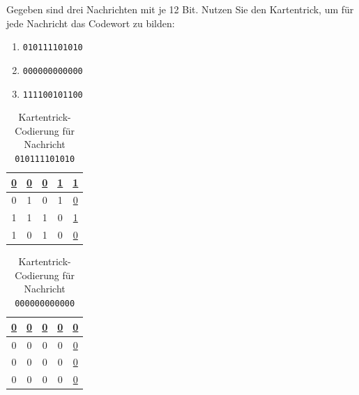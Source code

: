\begin{myexercise}
    Gegeben sind drei Nachrichten mit je 12 Bit. Nutzen Sie den Kartentrick, um für jede Nachricht das Codewort zu bilden:

    \begin{enumerate}
        \item \texttt{010111101010}
        \item \texttt{000000000000}
        \item \texttt{111100101100}
    \end{enumerate}

    \begin{myanswer}
        \begin{table}[H]
            \centering
            \begin{tabular}{ccccc}
                \underline{0} & \underline{0} & \underline{0} & \underline{1} & \underline{1} \\ \midrule
                0             & 1             & 0             & 1             & \underline{0} \\ \midrule
                1             & 1             & 1             & 0             & \underline{1} \\ \midrule
                1             & 0             & 1             & 0             & \underline{0} \\
            \end{tabular}
            \caption{Kartentrick-Codierung für Nachricht \texttt{010111101010}}
            \label{tab:codeword1}
        \end{table}
        \begin{table}[H]
            \centering
            \begin{tabular}{ccccc}
                \underline{0} & \underline{0} & \underline{0} & \underline{0} & \underline{0} \\ \midrule
                0             & 0             & 0             & 0             & \underline{0} \\ \midrule
                0             & 0             & 0             & 0             & \underline{0} \\ \midrule
                0             & 0             & 0             & 0             & \underline{0} \\
            \end{tabular}
            \caption{Kartentrick-Codierung für Nachricht \texttt{000000000000}}
            \label{tab:codeword2}
        \end{table}

\end{myanswer}
\end{myexercise}

